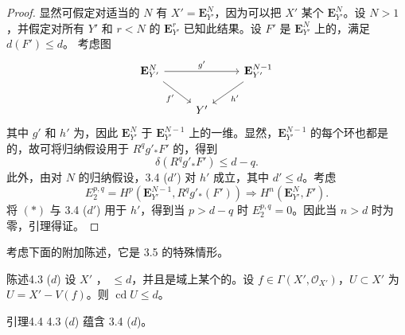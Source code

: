 \begin{proof}
显然可假定对适当的 $N$ 有 $X'=\mathbf E_{Y'}^N$，因为可以把 $X'$ 某个 $\mathbf E_{Y'}^N$。设 $N>1$，并假定对所有 $Y'$ 和 $r<N$ 的 $\mathbf E_{Y'}^r$ 已知此结果。设 $F'$ 是 $\mathbf E_{Y'}^N$ 上的，满足 $d(F')\leq d$。
考虑图
\[
\begin{tikzcd}
\mathbf E_{Y'}^N\arrow[rr,"g'"]\arrow[dr,"f'"']&&\mathbf E_{Y'}^{N-1}\arrow[dl,"h'"]\\
&Y'&
\end{tikzcd}
\]
其中 $g'$ 和 $h'$ 为，因此 $\mathbf E_{Y'}^N$ 于 $\mathbf E_{Y'}^{N-1}$ 上的一维。显然，$\mathbf E_{Y'}^{N-1}$ 的每个环也都是的，故可将归纳假设用于 $R^qg'_*F'$ 的，得到
\[
\delta(R^qg'_*F')\leq d-q.\tag{*}
\]
此外，由对 $N$ 的归纳假设，3.4 ($d'$) 对 $h'$ 成立，其中 $d'\leq d$。考虑 
\[
E_2^{p,q}=H^p(\mathbf E_{Y'}^{N-1},R^qg'_*(F'))\Longrightarrow H^n(\mathbf E_{Y'}^N,F').
\]
将 $(*)$ 与 3.4 ($d'$) 用于 $h'$，得到当 $p>d-q$ 时 $E_2^{p,q}=0$。因此当 $n>d$ 时为零，引理得证。
\end{proof}
考虑下面的附加陈述，它是 3.5 的特殊情形。
\begin{SGAresult}{陈述}{4.3 ($d$)}
设 $X'$ ， $\leq d$，并且是域上某个的。设 $f\in\Gamma(X',\mathcal O_{X'})$，$U\subset X'$ 为 $U=X'-V(f)$。则 $\operatorname{cd}U\leq d$。
\end{SGAresult}
\begin{SGAresult}{引理}{4.4}
4.3 ($d$) 蕴含 3.4 ($d$)。
\end{SGAresult}
